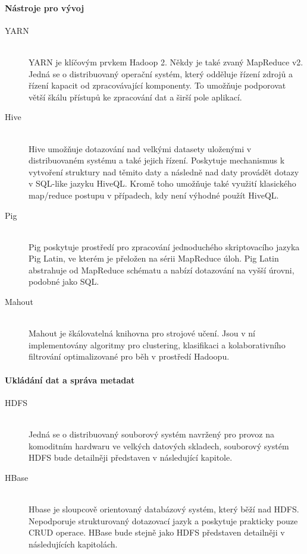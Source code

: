\documentclass[thesis=M,czech]{FITthesis}[2012/06/26]
\begin{document}
\paragraph{Nástroje pro vývoj}
\begin{description}
\item[YARN] \hfill \\
YARN je klíčovým prvkem Hadoop 2. Někdy je také zvaný  MapReduce v2. Jedná se o distribuovaný operační systém, který odděluje řízení zdrojů a řízení kapacit od zpracovávající komponenty. To umožňuje  podporovat větší škálu přístupů ke zpracování dat a širší pole aplikací.

\item[Hive] \hfill \\
Hive umožňuje dotazování nad velkými datasety uloženými v distribuovaném systému a také jejich řízení. Poskytuje mechanismus k vytvoření struktury nad těmito daty a následně nad daty provádět dotazy v SQL-like  jazyku HiveQL. Kromě toho umožňuje také využití klasického map/reduce postupu v případech, kdy není výhodné použít HiveQL. 

\item[Pig] \hfill \\
Pig poskytuje prostředí pro zpracování jednoduchého skriptovacího jazyka Pig Latin, ve kterém je přeložen na sérii MapReduce úloh. Pig Latin abstrahuje od MapReduce schématu a nabízí dotazování na vyšší úrovni, podobné jako SQL.

\item[Mahout] \hfill \\
Mahout je škálovatelná knihovna pro strojové učení. Jsou v ní implementovány algoritmy pro clustering, klasifikaci a kolaborativního filtrování optimalizované pro běh v prostředí Hadoopu.
\end{description}
\paragraph{Ukládání dat a správa metadat}
\begin{description}
\item[HDFS] \hfill \\
Jedná se o distribuovaný souborový systém navržený  pro provoz na komoditním hardwaru ve velkých datových skladech, souborový systém HDFS bude detailněji představen v následující kapitole.

\item[HBase] \hfill \\
Hbase je sloupcově orientovaný databázový systém, který běží nad HDFS. Nepodporuje strukturovaný dotazovací jazyk a poskytuje prakticky pouze CRUD operace. HBase bude stejně jako HDFS představen detailněji v následujících kapitolách.
\end{description}
\end{document}

